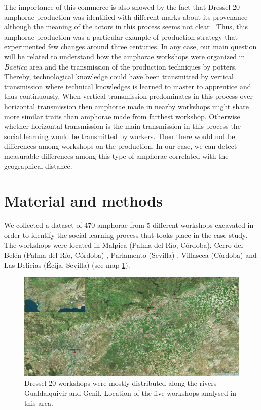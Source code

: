 \documentclass[review]{elsarticle}
\begin{document}
The importance of this commerce is also showed by the fact that Dressel 20 amphorae production was identified with different marks about its provenance although the meaning of the actors in this process seems not clear \citep{coto-sarmiento_maria_bayesian_????}. Thus, this amphorae production was a particular example of production strategy that experimented few changes around three centuries. In any case, our main question will be related to understand how the amphorae workshops were organized in \textit{Baetica} area and the transmission of the production techniques by potters. Thereby, technological knowledge could have been transmitted by vertical transmission where technical knowledges is learned to master to apprentice and thus continuously. When vertical transmission predominates in this process over horizontal transmission then amphorae made in nearby workshops might share more similar traits than amphorae made from farthest workshop. Otherwise whether horizontal transmission is the main transmission in this process the social learning would be transmitted by workers. Then there would not be differences among workshops on the production. In our case, we can detect measurable differences among this type of amphorae correlated with the geographical distance.


\section{Material and methods}

We collected a dataset of 470 amphorae from 5 different workshops excavated in order to identify the social learning process that tooks place in the case study. The workshops were located in Malpica (Palma del R\'io, C\'ordoba), Cerro del Bel\'en (Palma del R\'io, C\'ordoba) \citep{diaz_trujillo_excavacion_1992}, Parlamento (Sevilla) \citep{garcia_vargas_anforas_2000}, Villaseca (C\'ordoba)\citep{garcia_vargas_enrique_excavacion_????} and Las Delicias (\'Ecija, Sevilla) \citep{fernandez_excavacion_2001,_atelier_2014} (see map \ref{romanworkshop}).


\begin{figure}[htp]
	\centering
\includegraphics[scale=0.30]{romanworkshop.png}
\caption{Dressel 20 workshops were mostly distributed along the rivers Gualdalquivir and Genil. Location of the five workshops analysed in this area.}
\label{romanworkshop}
\end{figure} 
\end{document}
